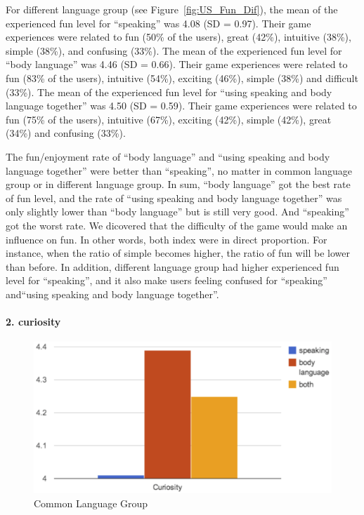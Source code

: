 For different language group (see Figure~\ref{fig:US_Fun_Dif}), the mean of the experienced fun level for ``speaking'' was 4.08 (SD = 0.97). Their game experiences were related to fun (50\% of the users), great (42\%), intuitive (38\%), simple (38\%), and confusing (33\%). The mean of the experienced fun level for ``body language'' was 4.46 (SD = 0.66). Their game experiences were related to fun (83\% of the users), intuitive (54\%), exciting (46\%), simple (38\%) and difficult (33\%). The mean of the experienced fun level for ``using speaking and body language together'' was 4.50 (SD = 0.59). Their game experiences were related to fun (75\% of the users), intuitive (67\%), exciting (42\%), simple (42\%), great (34\%) and confusing (33\%).

The fun/enjoyment rate of ``body language'' and ``using speaking and body language together'' were better than ``speaking'', no matter in common language group or in different language group. In sum, ``body language'' got the best rate of fun level, and the rate of ``using speaking and body language together'' was only slightly lower than ``body language'' but is still very good. And ``speaking'' got the worst rate. We dicovered that the difficulty of the game would make an influence on fun. In other words, both index were in direct proportion. For instance, when the ratio of simple becomes higher, the ratio of fun will be lower than before. In addition, different language group had higher experienced fun level for ``speaking'', and it also make users feeling confused for ``speaking'' and``using speaking and body language together''.



\paragraph{2. curiosity}


\begin{figure}[!h]
\centering
\includegraphics[width=0.9\columnwidth]{Figures/US_Curi_Com.png}
\caption{Common Language Group}
\label{fig:US_Curi_Com}
\end{figure}

